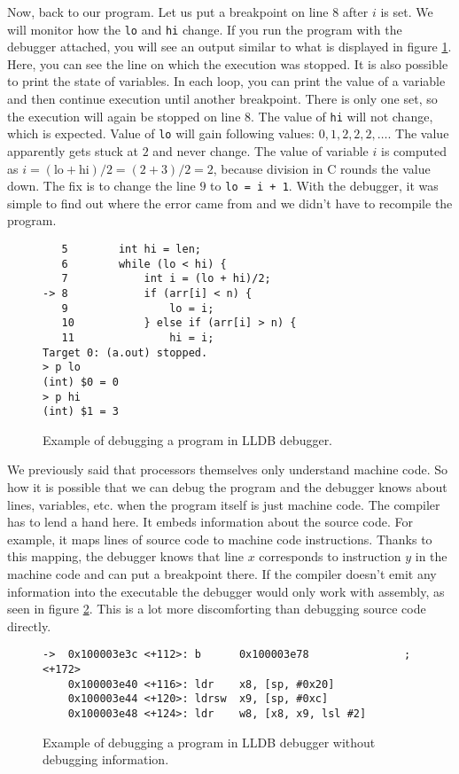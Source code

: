 Now, back to our program. Let us put a breakpoint on line $8$ after $i$ is set.
We will monitor how the \texttt{lo} and \texttt{hi} change. If you run the
program with the debugger attached, you will see an output similar to what is
displayed in figure \ref{fig:lldb-debug1}. Here, you can see the line on which
the execution was stopped. It is also possible to print the state of variables.
In each loop, you can print the value of a variable and then continue execution
until another breakpoint. There is only one set, so the execution will again be
stopped on line $8$. The value of \texttt{hi} will not change, which is
expected. Value of \texttt{lo} will gain following values: $0, 1, 2, 2, 2,
\dots$. The value apparently gets stuck at $2$ and never change. The value of
variable $i$ is computed as $i = (\text{lo} + \text{hi})/2 = (2 + 3)/2 = 2$,
because division in C rounds the value down. The fix is to change the line $9$
to \texttt{lo = i + 1}. With the debugger, it was simple to find out where the
error came from and we didn't have to recompile the program.

\begin{figure}\label{fig:lldb-debug1}
\begin{verbatim}
   5   	    int hi = len;
   6   	    while (lo < hi) {
   7   	        int i = (lo + hi)/2;
-> 8   	        if (arr[i] < n) {
   9   	            lo = i;
   10  	        } else if (arr[i] > n) {
   11  	            hi = i;
Target 0: (a.out) stopped.
> p lo
(int) $0 = 0
> p hi
(int) $1 = 3
\end{verbatim}
\caption{Example of debugging a program in LLDB debugger.}
\end{figure}

We previously said that processors themselves only understand machine code. So
how it is possible that we can debug the program and the debugger knows about
lines, variables, etc. when the program itself is just machine code. The
compiler has to lend a hand here. It embeds information about the source code.
For example, it maps lines of source code to machine code instructions. Thanks
to this mapping, the debugger knows that line $x$ corresponds to instruction
$y$ in the machine code and can put a breakpoint there. If the compiler doesn't
emit any information into the executable the debugger would only work with
assembly, as seen in figure \ref{fig:lldb-debug2}. This is a lot more
discomforting than debugging source code directly.

\begin{figure}\label{fig:lldb-debug2}
\begin{lstlisting}
->  0x100003e3c <+112>: b      0x100003e78               ; <+172>
    0x100003e40 <+116>: ldr    x8, [sp, #0x20]
    0x100003e44 <+120>: ldrsw  x9, [sp, #0xc]
    0x100003e48 <+124>: ldr    w8, [x8, x9, lsl #2]
\end{lstlisting}
\caption{Example of debugging a program in LLDB debugger without debugging information.}
\end{figure}

